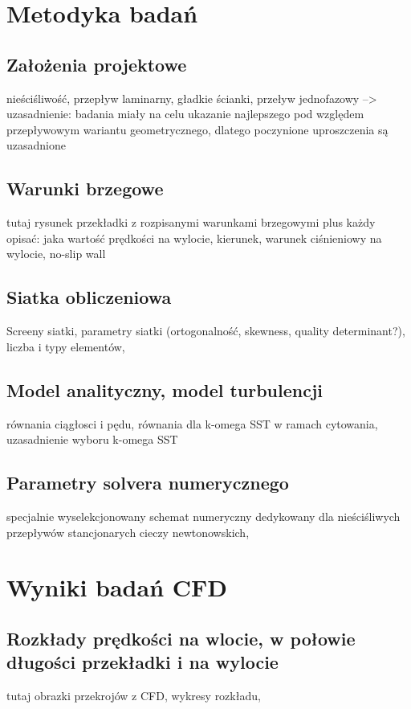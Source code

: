 \documentclass[peerreview]{IEEEtran}
\begin{document}

\section{Metodyka badań}
  
\subsection{Założenia projektowe}
nieściśliwość, przepływ laminarny, gładkie ścianki, przeływ jednofazowy --> uzasadnienie: badania miały na celu ukazanie najlepszego pod względem przepływowym wariantu geometrycznego, dlatego poczynione uproszczenia są uzasadnione
\subsection{Warunki brzegowe}
tutaj rysunek przekładki z rozpisanymi warunkami brzegowymi plus każdy opisać: jaka wartość prędkości na wylocie, kierunek, warunek ciśnieniowy na wylocie, no-slip wall  
\subsection{Siatka obliczeniowa}
Screeny siatki, parametry siatki (ortogonalność, skewness, quality determinant?), liczba i typy elementów,
\subsection{Model analityczny, model turbulencji}
równania ciągłosci i pędu, równania dla k-omega SST w ramach cytowania, uzasadnienie wyboru k-omega SST 
\subsection{Parametry solvera numerycznego}
specjalnie wyselekcjonowany schemat numeryczny dedykowany dla nieściśliwych przepływów stancjonarych cieczy newtonowskich, 



\section{Wyniki badań CFD} \label{sec:criteria}

\subsection{Rozkłady prędkości na wlocie, w połowie długości przekładki i na wylocie}
tutaj obrazki przekrojów z CFD, wykresy rozkładu, 
\end{document}
